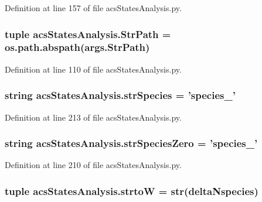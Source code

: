 Definition at line 157 of file acs\-States\-Analysis.\-py.

\hypertarget{a00099_ac34f3f43f888eb6620266d78ce928ceb}{
\subsubsection[{Str\-Path}]{\setlength{\rightskip}{0pt plus 5cm}tuple acs\-States\-Analysis.\-Str\-Path = os.\-path.\-abspath(args.\-Str\-Path)}}\label{a00099_ac34f3f43f888eb6620266d78ce928ceb}


Definition at line 110 of file acs\-States\-Analysis.\-py.

\hypertarget{a00099_ab14d209fe558e83aeede3b657a7241bb}{
\subsubsection[{str\-Species}]{\setlength{\rightskip}{0pt plus 5cm}string acs\-States\-Analysis.\-str\-Species = 'species\-\_\-'}}\label{a00099_ab14d209fe558e83aeede3b657a7241bb}


Definition at line 213 of file acs\-States\-Analysis.\-py.

\hypertarget{a00099_a52f7239b2be2cb978182547960b6c46e}{
\subsubsection[{str\-Species\-Zero}]{\setlength{\rightskip}{0pt plus 5cm}string acs\-States\-Analysis.\-str\-Species\-Zero = 'species\-\_\-'}}\label{a00099_a52f7239b2be2cb978182547960b6c46e}


Definition at line 210 of file acs\-States\-Analysis.\-py.

\hypertarget{a00099_abe05028c33fab522e3b940195eaaa586}{
\subsubsection[{strto\-W}]{\setlength{\rightskip}{0pt plus 5cm}tuple acs\-States\-Analysis.\-strto\-W = str({\bf delta\-Nspecies})}}\label{a00099_abe05028c33fab522e3b940195eaaa586}



